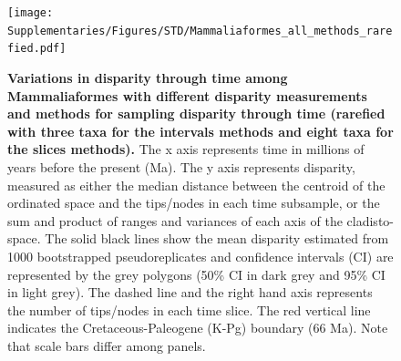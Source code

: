 \begin{landscape}
\begin{figure}[!htbp]
\centering
    \texttt{[image: Supplementaries/Figures/STD/Mammaliaformes\_all\_methods\_rarefied.pdf]}
\caption[Comparison of all the disparity metrics and all the time sampling methods for Mammaliaformes (rarefied)]{\textbf{Variations in disparity through time among Mammaliaformes with different disparity measurements and methods for sampling disparity through time (rarefied with three taxa for the intervals methods and eight taxa for the slices methods).} The x axis represents time in millions of years before the present (Ma). The y axis represents disparity, measured as either the median distance between the centroid of the ordinated space and the tips/nodes in each time subsample, or the sum and product of ranges and variances of each axis of the cladisto-space. The solid black lines show the mean disparity estimated from 1000 bootstrapped pseudoreplicates and confidence intervals (CI) are represented by the grey polygons (50\% CI in dark grey and 95\% CI in light grey). The dashed line and the right hand axis represents the number of tips/nodes in each time slice. The red vertical line indicates the Cretaceous-Paleogene (K-Pg) boundary (66 Ma). Note that scale bars differ among panels.}
\label{Supp_disparity_all_Mammaliaformes_rarefied}
\end{figure}
\end{landscape}

